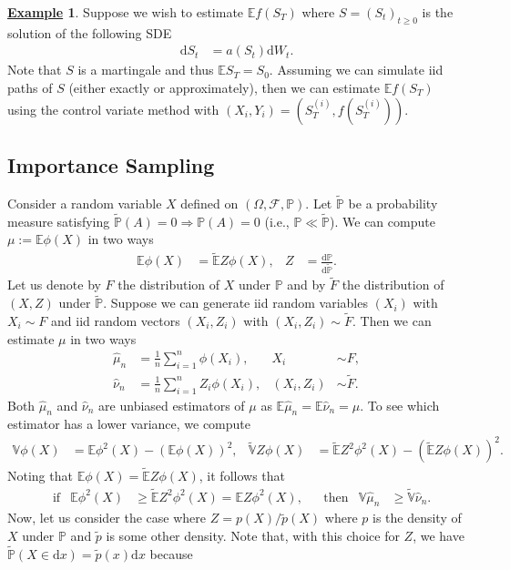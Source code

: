 \documentclass[12pt]{book}
\let\varphi\phi
\numberwithin{equation}{chapter}
\theoremstyle{plain}
\numberwithin{theorem}{section}
\theoremstyle{definition}
\newtheorem{example}[theorem]{\underline{Example}}
\numberwithin{exercise}{chapter}
\newcommand{\<}{\langle}
\renewcommand{\>}{\rangle}
\renewcommand{\(}{\left(}
\renewcommand{\)}{\right)}
\renewcommand{\[}{\left[}
\renewcommand{\]}{\right]}
\newcommand\Eb{\mathds{E}}
\newcommand\Pb{\mathds{P}}
\newcommand\Vb{\mathds{V}}
\newcommand\Fc{\mathscr{F}}
\newcommand\Om{\Omega}
\newcommand\nuh{\widehat{\nu}}
\newcommand\muh{\widehat{\mu}}
\newcommand\Ebt{\widetilde{\Eb}}
\newcommand\Pbt{\widetilde{\Pb}}
\newcommand\Vbt{\widetilde{\Vb}}
\newcommand\Ft{\widetilde{F}}
\newcommand\pt{\widetilde{p}}
\newcommand\dd{\mathrm{d}}
\begin{document}
\begin{example}
Suppose we wish to estimate $\Eb f(S_T)$ where $S = (S_t)_{t \geq 0}$ is the solution of the following SDE
\begin{align}
\dd S_t
	&=	a(S_t) \dd W_t .
\end{align}
Note that $S$ is a martingale and thus $\Eb S_T = S_0$.  Assuming we can simulate iid paths of $S$ (either exactly or approximately), then we can estimate $\Eb f(S_T)$ using the control variate method with $(X_i,Y_i) = (S_T^{(i)},f(S_T^{(i)}))$.
\end{example}

\subsection{Importance Sampling}
\label{sec:importance}
Consider a random variable $X$ defined on $(\Om,\Fc,\Pb)$.  Let $\Pbt$ be a probability measure satisfying $\Pbt(A) = 0 \Rightarrow \Pb(A) = 0$ (i.e., $\Pb \ll \Pbt$).  We can compute $\mu := \Eb \varphi(X)$ in two ways
\begin{align}
\Eb \varphi(X)
	&=	\Ebt Z \varphi(X) , &
Z
	&=	\frac{\dd \Pb}{\dd \Pbt} .
\end{align}
Let us denote by $F$ the distribution of $X$ under $\Pb$ and by $\Ft$ the distribution of $(X,Z)$ under $\Pbt$.  Suppose we can generate iid random variables $(X_i)$ with $X_i \sim F$ and iid random vectors $(X_i,Z_i)$ with $(X_i,Z_i) \sim \Ft$.  Then we can estimate $\mu $ in two ways
\begin{align}
\muh_n
	&=	\frac{1}{n} \sum_{i=1}^n \varphi(X_i) , &
X_i
	&\sim F , \\
\nuh_n
	&=	\frac{1}{n} \sum_{i=1}^n Z_i \varphi(X_i) , &
(X_i,Z_i)
	&\sim \Ft .
\end{align}
Both $\muh_n$ and $\nuh_n$ are unbiased estimators of $\mu$ as $\Eb \muh_n = \Eb \nuh_n = \mu$.  To see which estimator has a lower variance, we compute
\begin{align}
\Vb \varphi(X)
	&=	\Eb \varphi^2(X) - (\Eb \varphi(X))^2 , &
\Vbt Z \varphi(X)
	&=	\Ebt Z^2 \varphi^2(X) - (\Ebt Z \varphi(X))^2 .
\end{align}
Noting that $\Eb \varphi(X) = \Ebt Z \varphi(X)$, it follows that
\begin{align}
	&\text{if}&
\Eb \varphi^2(X) 
	&\geq \Ebt Z^2 \varphi^2(X) = \Eb Z \varphi^2(X), &
	&\text{then}&
\Vb \muh_n 
	&\geq \Vbt \nuh_n .
\end{align}
Now, let us consider the case where $Z = p(X)/\pt(X)$ where $p$ is the density of $X$ under $\Pb$ and $\pt$ is some other density.  Note that, with this choice for $Z$, we have $\Pbt( X \in \dd x) = \pt(x) \dd x$ because
\end{document}
